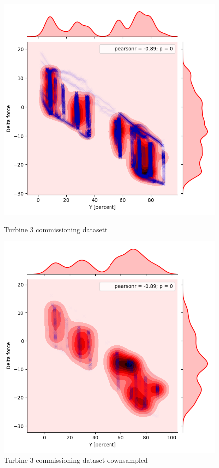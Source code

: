 \begin{figure}
    \begin{minipage}[b]{0.5\linewidth}
        \includegraphics[width=1\linewidth]{figures/data/kdePlot_noServo_A3.png} 
        \caption{Turbine 3 commissioning datasett } 
    \end{minipage}
      \hfill
      \begin{minipage}[b]{0.5\linewidth}
        \includegraphics[width=1\linewidth]{figures/data/kdePlot_reduced_noServo_A3.png} 
        \caption{Turbine 3 commissioning dataset downsampled} 
    \end{minipage} 
\end{figure}

